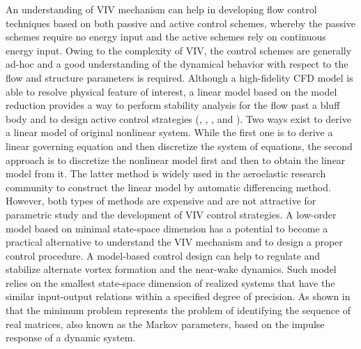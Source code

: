 \documentclass{jfm}
\begin{document}
An understanding of VIV mechanism can help in developing flow control techniques 
based on both passive and active control schemes, 
whereby the passive schemes require no energy input and  the active schemes 
rely on continuous energy input. 
%
Owing to the complexity of VIV, the control schemes are generally 
ad-hoc and a good understanding of the dynamical behavior 
with respect to the flow and structure parameters is required.
%
Although a high-fidelity CFD model is able to resolve physical feature of interest, a linear model based on the model reduction provides a way to perform stability analysis for the flow past a bluff body and to design active control strategies (\cite{Marquet2008}, \cite{Thompson2014}, \cite{Mettot2014}, and \cite{Flinois2016}). 
Two ways exist to derive a linear model of original nonlinear system. 
While the first one is to derive a linear governing equation and then discretize the system of equations, the second approach is to discretize the nonlinear model first and 
then to obtain the linear model from it. 
The latter method is widely used in the aeroelastic research community to construct the linear model by automatic differencing method. 
However, both types of methods are expensive and are not attractive 
for parametric study and the development of VIV control strategies. 
%
A low-order model based on minimal state-space dimension has a potential to 
become a practical alternative to understand the VIV mechanism and 
to design a proper control procedure. A model-based control design can help to 
regulate and stabilize alternate vortex formation and the near-wake dynamics.
%
Such model relies on the smallest state-space dimension of realized systems that 
have the similar input-output relations within a specified degree of precision. 
As shown in \cite{HoKalman1966} that the minimum problem represents  
the problem of identifying the sequence of real matrices, also known as the Markov parameters, 
based on the impulse response of a dynamic system.
%
\end{document}
